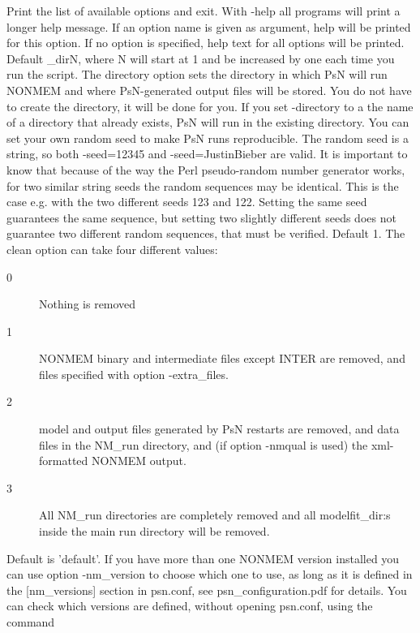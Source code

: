 \begin{optionlist}
Print the list of available options and exit. 
\nextopt
{}
With -help all programs will print a longer help message. 
If an option name is given as argument, help will be printed for this option. 
If no option is specified, help text for all options will be printed. 
\nextopt
{}
Default \guidetoolname\_dirN,
where N will start at 1 and
be increased by one each time you run the script. The directory option sets the directory in which PsN 
will run NONMEM and where PsN-generated output files will be stored. 
You do not have to create the directory,  it will be done for you. If you set
-directory to a the name of a directory that already exists, PsN will run in the existing directory.
\nextopt
{}
You can set your own random seed to make PsN runs reproducible.
The random seed is a string, so both -seed=12345 and -seed=JustinBieber are valid.
It is important to know that because of the way the Perl pseudo-random
number generator works, for two similar string seeds the random sequences may be identical. 
This is the case e.g. with the two different seeds 123 and 122. 
Setting the same seed guarantees the same sequence, but setting two slightly different 
seeds does not guarantee two different random sequences, that must be verified.
\nextopt
{}
Default 1. The clean option can take four different values:  
\begin{description}
\item[0] Nothing is removed 
\item[1] NONMEM binary and intermediate files except INTER are removed, and files specified with option -extra\_files. 
\item[2] model and output files generated by PsN restarts are removed, and data files in the NM\_run directory, and (if option -nmqual is used) the xml-formatted NONMEM output. 
\item[3] All NM\_run directories are completely removed and all modelfit\_dir:s inside the main run directory
will be removed. 
\end{description}
\nextopt
{}
Default is 'default'. 
If you have more than one NONMEM version installed you can use option
-nm\_version to choose which one to use, as long as it is 
defined in the [nm\_versions] section in psn.conf, see psn\_configuration.pdf for details. 
You can check which versions are defined, without opening psn.conf, using the command
\begin{verbatim}

\end{verbatim}
\end{optionlist}
